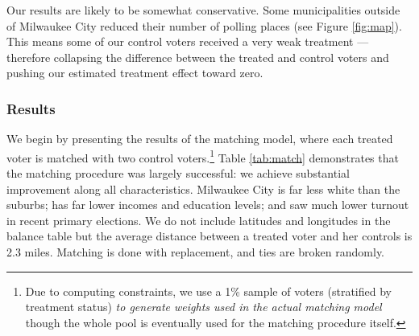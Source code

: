 \documentclass[
  12pt,
]{article}
\begin{document}
Our results are likely to be somewhat conservative. Some municipalities outside of Milwaukee City reduced their number of polling places (see Figure \ref{fig:map}). This means some of our control voters received a very weak treatment --- therefore collapsing the difference between the treated and control voters and pushing our estimated treatment effect toward zero.

\hypertarget{results}{%
\subsubsection*{Results}\label{results}}

We begin by presenting the results of the matching model, where each treated voter is matched with two control voters.\footnote{Due to computing constraints, we use a 1\% sample of voters (stratified by treatment status) \emph{to generate weights used in the actual matching model} though the whole pool is eventually used for the matching procedure itself.} Table \ref{tab:match} demonstrates that the matching procedure was largely successful: we achieve substantial improvement along all characteristics. Milwaukee City is far less white than the suburbs; has far lower incomes and education levels; and saw much lower turnout in recent primary elections. We do not include latitudes and longitudes in the balance table but the average distance between a treated voter and her controls is 2.3 miles. Matching is done with replacement, and ties are broken randomly.
\end{document}
